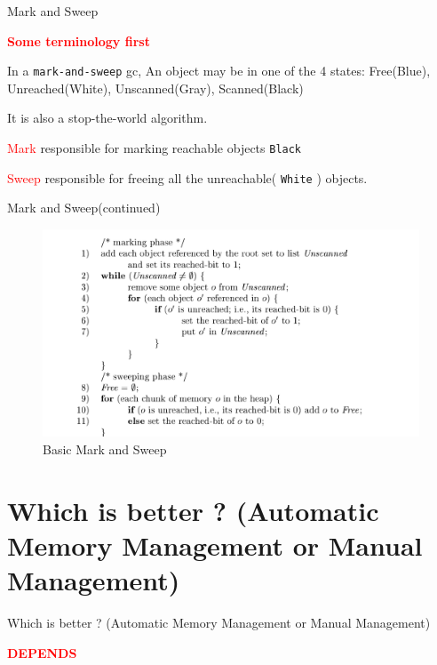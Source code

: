 \documentclass[
  10pt,
  ignorenonframetext,
]{beamer}
\begin{document}
\begin{frame}{Mark and Sweep}
\protect\hypertarget{mark-and-sweep}{}
\pause

\centering \textbf{\textcolor{red}{Some terminology first}}

\pause

In a \texttt{mark-and-sweep} gc, An object may be
in one of the 4 states: Free(Blue),
Unreached(White), Unscanned(Gray), Scanned(Black)

\pause

It is also a stop-the-world algorithm.

\pause \textcolor{red}{Mark}
\rightarrow responsible for marking reachable
objects \texttt{Black}

\pause \textcolor{red}{Sweep}
\rightarrow responsible for freeing all the
unreachable( \texttt{White} ) objects.
\end{frame}

\begin{frame}{Mark and Sweep(continued)}
\protect\hypertarget{mark-and-sweepcontinued}{}
\begin{figure}
\centering
\includegraphics{images/mark_and_sweep.png}
\caption{Basic Mark and Sweep}
\end{figure}
\end{frame}

\hypertarget{which-is-better-automatic-memory-management-or-manual-management}{%
\section{Which is better ? (Automatic Memory
Management or Manual
Management)}\label{which-is-better-automatic-memory-management-or-manual-management}}

\begin{frame}{Which is better ? (Automatic Memory
Management or Manual Management)}
\pause

\huge

\centering \textbf{\textcolor{red}{DEPENDS}}
\normalsize
\end{frame}
\end{document}
